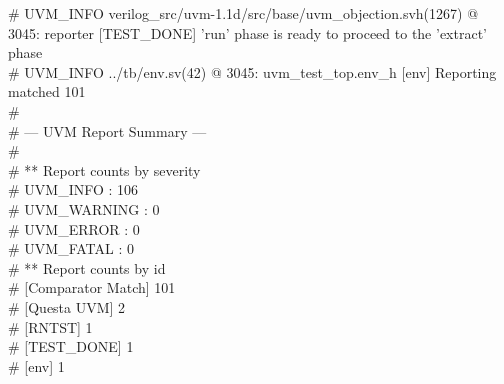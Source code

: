 \# UVM\_INFO verilog\_src/uvm-1.1d/src/base/uvm\_objection.svh(1267) @ 3045: reporter [TEST\_DONE] 'run' phase is ready to proceed to the 'extract' phase\\
\# UVM\_INFO ../tb/env.sv(42) @ 3045: uvm\_test\_top.env\_h [env] Reporting matched 101\\
\# \\
\# --- UVM Report Summary ---\\
\# \\
\# ** Report counts by severity\\
\# UVM\_INFO :  106\\
\# UVM\_WARNING :    0\\
\# UVM\_ERROR :    0\\
\# UVM\_FATAL :    0\\
\# ** Report counts by id\\
\# [Comparator Match]   101\\
\# [Questa UVM]     2\\
\# [RNTST]     1\\
\# [TEST\_DONE]     1\\
\# [env]     1\\
